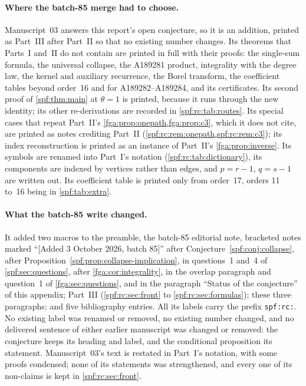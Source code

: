\documentclass[11pt]{article}
\numberwithin{equation}{section}
\theoremstyle{definition}
\theoremstyle{remark}
\theoremstyle{definition}
\begin{document}
\paragraph{Where the batch-85 merge had to choose.} Manuscript~03 answers
this report's open conjecture, so it is an addition, printed as Part~III
after Part~II so that no existing number changes. Its theorems that Parts~I
and~II do not contain are printed in full with their proofs: the single-sum
formula, the universal collapse, the A189281 product, integrality with the
degree law, the kernel and auxiliary recurrence, the Borel transform, the
coefficient tables beyond order~16 and for A189282--A189284, and its
certificates. Its second proof of \cref{spf:thm:main} at $\theta=1$ is
printed, because it runs through the new identity; its other
re-derivations are recorded in \cref{spf:rc:tab:routes}. Its special cases
that repeat Part~II's \cref{fga:prop:onepath,fga:prop:c3}, which it does
not cite, are printed as notes crediting Part~II
(\cref{spf:rc:rem:onepath,spf:rc:rem:c3}); its index reconstruction is
printed as an instance of Part~II's \cref{fga:prop:inverse}. Its symbols are
renamed into Part~I's notation (\cref{spf:rc:tab:dictionary}), its
components are indexed by vertices rather than edges, and $p=r-1$, $q=s-1$
are written out. Its coefficient table is printed only from order~17,
orders 11 to~16 being in \cref{spf:tab:extra}.

\paragraph{What the batch-85 write changed.} It added two macros to the
preamble, the batch-85 editorial note, bracketed notes marked ``[Added 3
October 2026, batch 85]'' after Conjecture~\ref{spf:conj:collapse}, after
Proposition~\ref{spf:prop:collapse-implication}, in questions~1 and~4 of
\cref{spf:sec:questions}, after \cref{fga:cor:integrality}, in the overlap
paragraph and question~1 of \cref{fga:sec:questions}, and in the paragraph
``Status of the conjecture'' of this appendix; Part~III
(\cref{spf:rc:sec:front} to \cref{spf:rc:sec:formulas}); these three
paragraphs; and five bibliography entries. All its labels carry the prefix
\texttt{spf:rc:}. No existing label was renamed or removed, no existing
number changed, and no delivered sentence of either earlier manuscript was
changed or removed: the conjecture keeps its heading and label, and the
conditional proposition its statement. Manuscript~03's text is restated in
Part~I's notation, with some proofs condensed; none of its statements was
strengthened, and every one of its non-claims is kept in
\cref{spf:rc:sec:front}.
\end{document}

